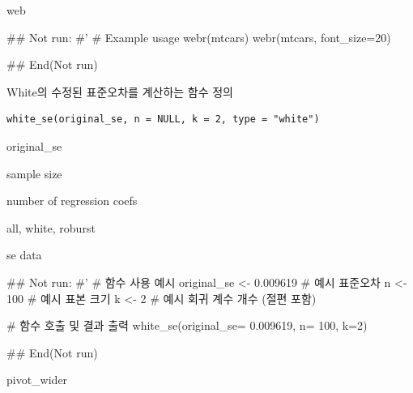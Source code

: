 \documentclass[a4paper]{book}
\begin{document}
%
\begin{Value}
web
\end{Value}
%
\begin{Examples}
\begin{ExampleCode}

## Not run: 
#'
# Example usage
webr(mtcars)
webr(mtcars, font_size=20)

## End(Not run)

\end{ExampleCode}
\end{Examples}
%
\begin{Description}
White의 수정된 표준오차를 계산하는 함수 정의
\end{Description}
%
\begin{Usage}
\begin{verbatim}
white_se(original_se, n = NULL, k = 2, type = "white")
\end{verbatim}
\end{Usage}
%
\begin{Arguments}
\begin{ldescription}
\item[\code{original\_se}] original\_se

\item[\code{n}] sample size

\item[\code{k}] number of regression coefs

\item[\code{type}] all, white, roburst
\end{ldescription}
\end{Arguments}
%
\begin{Value}
se data
\end{Value}
%
\begin{Examples}
\begin{ExampleCode}
## Not run: 
#'
# 함수 사용 예시
original_se <- 0.009619  # 예시 표준오차
n <- 100  # 예시 표본 크기
k <- 2  # 예시 회귀 계수 개수 (절편 포함)

# 함수 호출 및 결과 출력
white_se(original_se= 0.009619, n= 100, k=2)

## End(Not run)

\end{ExampleCode}
\end{Examples}
%
\begin{Description}
pivot\_wider
\end{Description}
\end{document}
